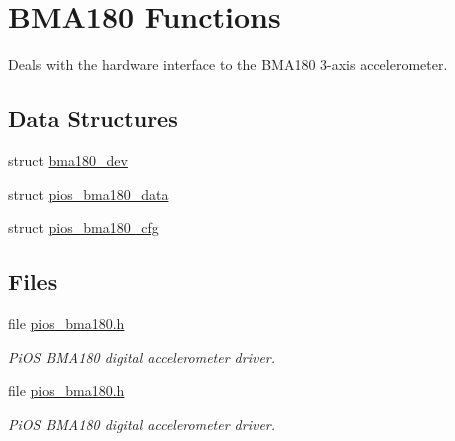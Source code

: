 \hypertarget{group___p_i_o_s___b_m_a180}{\section{\-B\-M\-A180 \-Functions}
\label{group___p_i_o_s___b_m_a180}
}


\-Deals with the hardware interface to the \-B\-M\-A180 3-\/axis accelerometer.  


\subsection*{\-Data \-Structures}
\begin{DoxyCompactItemize}
\item 
struct \hyperlink{structbma180__dev}{bma180\-\_\-dev}
\item 
struct \hyperlink{structpios__bma180__data}{pios\-\_\-bma180\-\_\-data}
\item 
struct \hyperlink{structpios__bma180__cfg}{pios\-\_\-bma180\-\_\-cfg}
\end{DoxyCompactItemize}
\subsection*{\-Files}
\begin{DoxyCompactItemize}
\item 
file \hyperlink{pios__bma180_8h}{pios\-\_\-bma180.\-h}
\begin{DoxyCompactList}\small\item\em \-Pi\-O\-S \-B\-M\-A180 digital accelerometer driver. \end{DoxyCompactList}\item 
file \hyperlink{pios__bma180_8h}{pios\-\_\-bma180.\-h}
\begin{DoxyCompactList}\small\item\em \-Pi\-O\-S \-B\-M\-A180 digital accelerometer driver. \end{DoxyCompactList}\end{DoxyCompactItemize}
